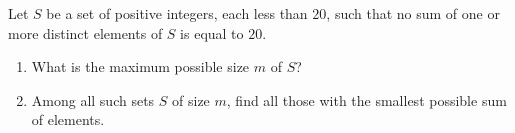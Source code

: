 Let $S$ be a set of positive integers, each less than $20$, such that no sum of one or more distinct elements of $S$ is equal to $20$.
\begin{enumerate}
\item[(a)] What is the maximum possible size $m$ of $S$?
\item[(b)] Among all such sets $S$ of size $m$, find all those with the smallest possible sum of elements.
\end{enumerate}
